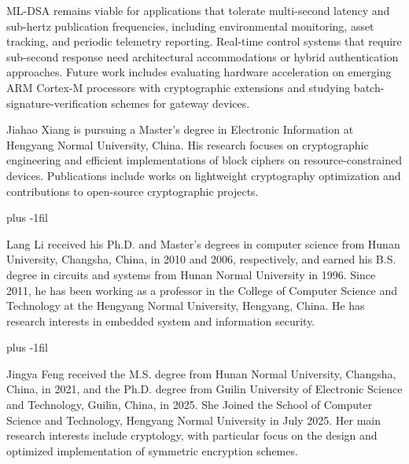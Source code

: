 \documentclass[final, twoside]{IEEEtran} %
\begin{document}
ML-DSA remains viable for applications that tolerate multi-second latency and sub-hertz publication frequencies, including environmental monitoring, asset tracking, and periodic telemetry reporting. Real-time control systems that require sub-second response need architectural accommodations or hybrid authentication approaches. Future work includes evaluating hardware acceleration on emerging ARM Cortex-M processors with cryptographic extensions and studying batch-signature-verification schemes for gateway devices.




\begin{IEEEbiographynophoto}{Jiahao Xiang}
	is pursuing a Master's degree in Electronic Information at Hengyang Normal University, China. His research focuses on cryptographic engineering and efficient implementations of block ciphers on resource-constrained devices. Publications include works on lightweight cryptography optimization and contributions to open-source cryptographic projects.
\end{IEEEbiographynophoto}

\baselineskip plus -1fil

\begin{IEEEbiographynophoto}{Lang Li}
	received his Ph.D. and Master's degrees in computer science from Hunan University, Changsha, China, in 2010 and 2006, respectively, and earned his B.S. degree in circuits and systems from Hunan Normal University in 1996. Since 2011, he has been working as a professor in the College of Computer Science and Technology at the Hengyang Normal University, Hengyang, China. He has research interests in embedded system and information security.
\end{IEEEbiographynophoto}

\baselineskip plus -1fil

\begin{IEEEbiographynophoto} {Jingya Feng}
	received the M.S. degree from Hunan Normal University, Changsha, China, in 2021, and the Ph.D. degree from Guilin University of Electronic Science and Technology, Guilin, China, in 2025. She Joined the School of Computer Science and Technology, Hengyang Normal University in July 2025. Her main research interests include cryptology, with particular focus on the design and optimized implementation of symmetric encryption schemes.
\end{IEEEbiographynophoto}
\end{document}
